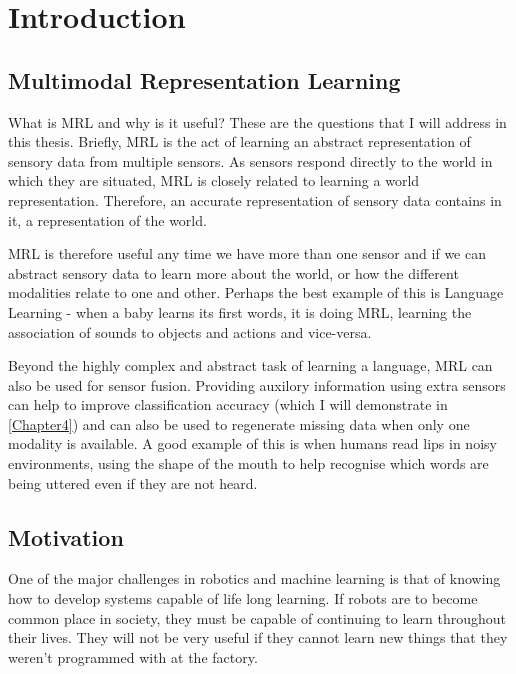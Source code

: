 
\chapter{Introduction} %

\label{Chapter1} %



\section{Multimodal Representation Learning}
What is \ac{MRL} and why is it useful? These are the questions that I will address in this thesis.
Briefly, \ac{MRL} is the act of learning an abstract representation of sensory data from multiple sensors. As sensors respond directly to the world in which they are situated, \ac{MRL} is closely related to learning a world representation. Therefore, an accurate representation of sensory data contains in it, a representation of the world.

\ac{MRL} is therefore useful any time we have more than one sensor and if we can abstract sensory data to learn more about the world, or how the different modalities relate to one and other. Perhaps the best example of this is Language Learning - when a baby learns its first words, it is doing \ac{MRL}, learning the association of sounds to objects and actions and vice-versa.

Beyond the highly complex and abstract task of learning a language, \ac{MRL} can also be used for sensor fusion. Providing auxilory information using extra sensors can help to improve classification accuracy (which I will demonstrate in \autoref{Chapter4}) and can also be used to regenerate missing data when only one modality is available.  A good example of this is when humans read lips in noisy environments, using the shape of the mouth to help recognise which words are being uttered even if they are not heard.


\section{Motivation}
One of the major challenges in robotics and machine learning is that of knowing how to develop systems capable of life long learning. If robots are to become common place in society, they must be capable of continuing to learn throughout their lives. They will not be very useful if they cannot learn new things that they weren't programmed with at the factory.

